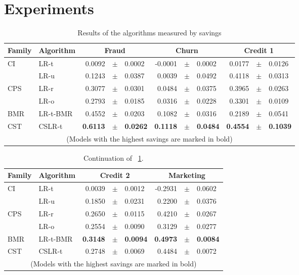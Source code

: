 \section{Experiments}
\label{sec:7:results}

\begin{table}[b]
    \centering
    \footnotesize
    \begin{tabular}{l l r@{\hskip 0in}c@{\hskip 0in}l r@{\hskip 0in}c@{\hskip 0in}l r@{\hskip 
    0in}c@{\hskip 0in}l  } %
    \hline
    \bf{Family} & \bf{Algorithm} & \multicolumn{3}{c}{\bf{Fraud}} & 
    \multicolumn{3}{c}{\bf{Churn}} & \multicolumn{3}{c}{\bf{Credit 1}} \\ 
    \hline
CI&LR-t & 0.0092 &$\pm$& 0.0002 & -0.0001 &$\pm$& 0.0002 & 0.0177 &$\pm$& 0.0126\\ 
&LR-u & 0.1243 &$\pm$& 0.0387 & 0.0039 &$\pm$& 0.0492 & 0.4118 &$\pm$& 0.0313\\ 
\hline 
CPS&LR-r & 0.3077 &$\pm$& 0.0301 & 0.0484 &$\pm$& 0.0375 & 0.3965 &$\pm$& 0.0263\\ 
&LR-o & 0.2793 &$\pm$& 0.0185 & 0.0316 &$\pm$& 0.0228 & 0.3301 &$\pm$& 0.0109\\ 
\hline 
BMR&LR-t-BMR & 0.4552 &$\pm$& 0.0203 & 0.1082 &$\pm$& 0.0316 & 0.2189 &$\pm$& 0.0541\\ 
\hline 
CST&CSLR-t & \bf{0.6113} &\bf{$\pm$}& \bf{0.0262} & \bf{0.1118} &\bf{$\pm$}& \bf{0.0484} & 
\bf{0.4554} &\bf{$\pm$}& \bf{0.1039}\\ 
\hline
  \multicolumn{11}{c}{(Models with the highest savings are marked in bold)}
  \end{tabular}
    \caption{Results of the algorithms measured by savings}
    \label{tab:7:results_savings}
  \end{table}
\begin{table}
    \centering
    \footnotesize
    \begin{tabular}{l l r@{\hskip 0in}c@{\hskip 0in}l r@{\hskip 0in}c@{\hskip 0in}l  } %
    \hline
    \bf{Family} & \bf{Algorithm} &  \multicolumn{3}{c}{\bf{Credit 2}} 
& \multicolumn{3}{c}{\bf{Marketing}} \\ 
    \hline
CI&LR-t & 0.0039 &$\pm$& 0.0012 & -0.2931 &$\pm$& 0.0602\\ 
&LR-u & 0.1850 &$\pm$& 0.0231 & 0.2200 &$\pm$& 0.0376\\ 
\hline 
CPS&LR-r & 0.2650 &$\pm$& 0.0115 & 0.4210 &$\pm$& 0.0267\\ 
&LR-o & 0.2554 &$\pm$& 0.0090 & 0.3129 &$\pm$& 0.0277\\ 
\hline 
BMR&LR-t-BMR & \bf{0.3148} &\bf{$\pm$}& \bf{0.0094} & \bf{0.4973} &\bf{$\pm$}& \bf{0.0084}\\ 
\hline 
CST&CSLR-t & 0.2748 &$\pm$& 0.0069 & 0.4484 &$\pm$& 0.0072\\ 
\hline 
  \multicolumn{8}{c}{(Models with the highest savings are marked in bold)}
  \end{tabular}
    \caption{Continuation of \tablename{~\ref{tab:7:results_savings}}.}
    \label{tab:7:results_savings2}
  \end{table}

